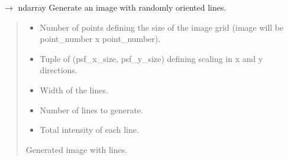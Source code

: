 \documentclass[letterpaper,10pt,english]{sphinxmanual}
\begin{document}
\begin{fulllineitems}
\label{\detokenize{source/ShapesGenerator:ShapesGenerator.generate_random_lines}}
\pysigstartsignatures
\pysiglinewithargsret
{}
{\sphinxparamcomma {}\sphinxparamcomma {}\sphinxparamcomma {}\sphinxparamcomma {}}
{{ $\rightarrow$ ndarray}}
\pysigstopsignatures
\sphinxAtStartPar
Generate an image with randomly oriented lines.
\begin{quote}\begin{description}
\begin{itemize}
\item {} 
\sphinxAtStartPar
{} \textendash{} Number of points defining the size of the image grid (image will be point\_number x point\_number).

\item {} 
\sphinxAtStartPar
{} \textendash{} Tuple of (psf\_x\_size, psf\_y\_size) defining scaling in x and y directions.

\item {} 
\sphinxAtStartPar
{} \textendash{} Width of the lines.

\item {} 
\sphinxAtStartPar
{} \textendash{} Number of lines to generate.

\item {} 
\sphinxAtStartPar
{} \textendash{} Total intensity of each line.

\end{itemize}

\sphinxAtStartPar
Generated image with lines.

\end{description}\end{quote}

\end{fulllineitems}
\end{document}
